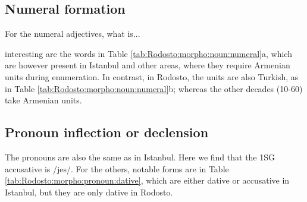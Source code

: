 \subsection{Numeral formation}

For the numeral adjectives, what is... 

\begin{adjarianpage}\label{page:260}\end{adjarianpage}%

interesting are the words in Table \ref{tab:Rodosto:morpho:noun:numeral}a, which are however present in Istanbul and other areas, where they require Armenian units during enumeration. In contrast, in Rodosto, the units are also Turkish, as in Table \ref{tab:Rodosto:morpho:noun:numeral}b; whereas the other decades (10-60) take Armenian units. 


\begin{table}[H]
	\centering 
	\caption{Borrowed numerals in the Rodosto dialect}
	\label{tab:Rodosto:morpho:noun:numeral}
\end{table}

\subsection{Pronoun inflection or declension}
The pronouns are also the same as in Istanbul. Here we find that the 1SG accusative is /jes/. For the others, notable forms are in Table \ref{tab:Rodosto:morpho:pronoun:dative}, which are either dative or accusative in Istanbul, but they are only dative in Rodosto. 


